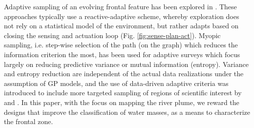 \documentclass[aoas]{imsart}
\begin{document}
Adaptive sampling of an evolving frontal feature has been explored in
\cite{fronts11,Zhang2012,Pinto2018,costa19}. These approaches
typically use a reactive-adaptive scheme, whereby exploration does not
rely on a statistical model of the environment, but rather adapts
based on closing the sensing and actuation loop
(Fig. \ref{fig:sense-plan-act}). Myopic sampling, i.e. step-wise
selection of the path (on the graph) which reduces the information
criterion the most, has been used for adaptive surveys
\citep{singh2009efficient,Binney2013} which focus largely on reducing
predictive variance or mutual information (entropy). Variance and
entropy reduction are independent of the actual data realizations
under the assumption of GP models, and the use of data-driven adaptive
criteria was introduced to include more targeted sampling of regions
of scientific interest by \cite{Low2009} and \cite{fossuminformation}.
In this paper, with the focus on mapping the river plume, we reward
the designs that improve the classification of water masses, as a
means to characterize the frontal zone.




\end{document}
